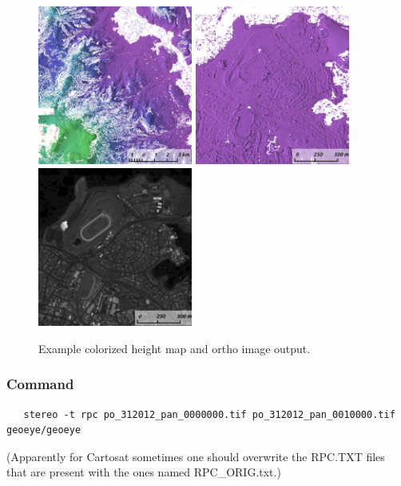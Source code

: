 \begin{figure}[h!]
\centering
  \includegraphics[width=2.0in]{images/examples/geoeye/GeoEye_ContextRender_400px.png}
  \includegraphics[width=2.0in]{images/examples/geoeye/GeoEye_CloseUp_400px.png}
  \includegraphics[width=2.0in]{images/examples/geoeye/GeoEye_CloseUpDRG_400px.png}
\caption{Example colorized height map and ortho image output.}
\label{fig:geoeye-nomap-example}
\end{figure}

\subsubsection*{Command}

\begin{verbatim}
   stereo -t rpc po_312012_pan_0000000.tif po_312012_pan_0010000.tif geoeye/geoeye
\end{verbatim}

(Apparently for Cartosat sometimes one should overwrite the RPC.TXT files that are present
with the ones named RPC\_ORIG.txt.)

